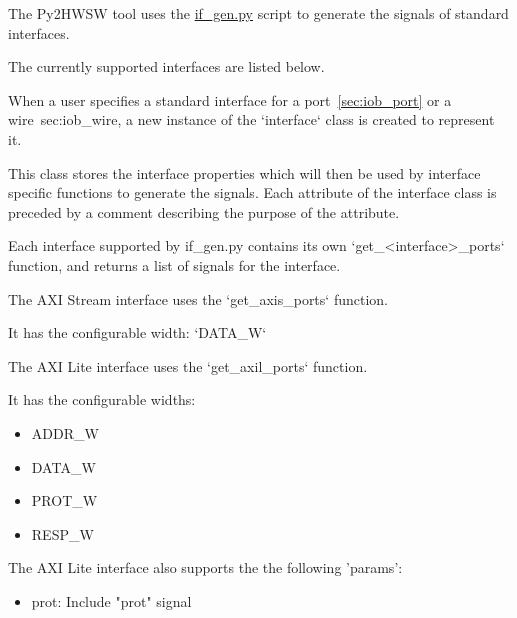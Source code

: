 %

%
%

The Py2HWSW tool uses the \href{https://github.com/IObundle/py2hwsw/blob/main/py2hwsw/scripts/if_gen.py}{if\_gen.py} script to generate the signals of standard interfaces.

The currently supported interfaces are listed below.


When a user specifies a standard interface for a port~\ref{sec:iob_port} or a wire~{sec:iob_wire}, a new instance of the `interface` class is created to represent it.


This class stores the interface properties which will then be used by interface specific functions to generate the signals.
Each attribute of the interface class is preceded by a comment describing the purpose of the attribute.

Each interface supported by if\_gen.py contains its own `get\_<interface>\_ports` function, and returns a list of signals for the interface.

%
%

The AXI Stream interface uses the `get\_axis\_ports` function.


It has the configurable width: `DATA_W`

%
%

The AXI Lite interface uses the `get\_axil\_ports` function.


It has the configurable widths: 
\begin{itemize}
  \item ADDR_W
  \item DATA_W
  \item PROT_W
  \item RESP_W
\end{itemize}

The AXI Lite interface also supports the the following 'params':
\begin{itemize}
  \item prot: Include "prot" signal
\end{itemize}

